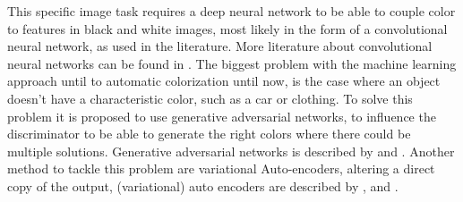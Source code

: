 This specific image task requires a deep neural network to be able to couple color to features in black and white images, most likely in the form of a convolutional neural network, as used in the literature. More literature about convolutional neural networks can be found in \cite{GoodfellowBOOK}. The biggest problem with the machine learning approach until to automatic colorization until now, is the case where an object doesn't have a characteristic color, such as a car or clothing. To solve this problem it is proposed to use generative adversarial networks, to influence the discriminator to be able to generate the right colors where there could be multiple solutions. Generative adversarial networks is described by \cite{Goodfellow} and \cite{Radford}. Another method to tackle this problem are variational Auto-encoders, altering a direct copy of the output, (variational) auto encoders are described by \cite{Gregor}, \cite{Kingma} and \cite{GoodfellowBOOK}.










